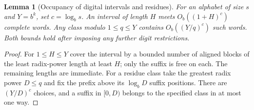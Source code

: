 \documentclass[11pt,a4paper]{article}
\theoremstyle{paperplain}
\newtheorem{lemma}[theorem]{Lemma}
\numberwithin{equation}{section}
\begin{document}
\begin{lemma}[Occupancy of digital intervals and residues]\label{common:occupancy}
For an alphabet of size $s$ and $Y=b^k$, set $c=\log_b s$.
An interval of length $H$ meets $O_b((1+H)^c)$ complete words.
Any class modulo $1\le q\le Y$ contains $O_b((Y/q)^c)$ such words.
Both bounds hold after imposing any further digit restrictions.
\end{lemma}
\begin{proof}
For $1\le H\le Y$ cover the interval by a bounded number of aligned
blocks of the least radix-power length at least $H$; only the suffix
is free on each. The remaining lengths are immediate. For a residue
class take the greatest radix power $D\le q$ and fix the prefix
above its $\log_b D$ suffix positions. There are $(Y/D)^c$ choices,
and a suffix in $[0,D)$ belongs to the specified class in at most one way.
\end{proof}
\end{document}
